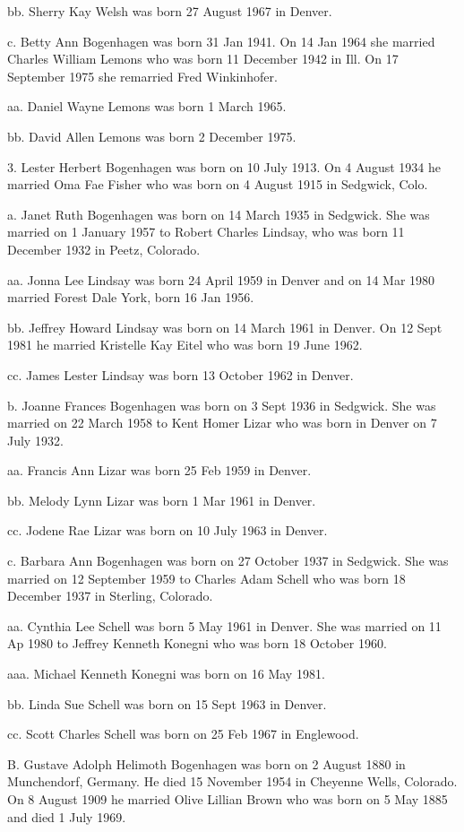 \documentclass[a4paper]{article}
\begin{document}
bb. Sherry Kay Welsh was born 27 August 1967 in Denver.

c. Betty Ann Bogenhagen was born 31 Jan 1941.  On 14 Jan 1964 she married Charles William Lemons who was born 11 December 1942 in Ill. On 17 September  1975 she remarried Fred Winkinhofer.

aa. Daniel Wayne Lemons was born 1 March 1965.

bb. David Allen Lemons was born 2 December 1975.

3. Lester Herbert Bogenhagen was born on 10 July 1913.  On 4 August 1934 he married Oma Fae Fisher who was born on 4 August 1915 in Sedgwick, Colo.

a. Janet Ruth Bogenhagen was born on 14 March 1935 in Sedgwick. She was married on 1 January 1957 to Robert Charles Lindsay, who was born 11 December 1932 in Peetz, Colorado.
 
aa. Jonna Lee Lindsay was born 24 April 1959 in Denver and on 14 Mar 1980 married Forest Dale York, born 16 Jan 1956.
			
bb.  Jeffrey Howard Lindsay was born on 14 March 1961 in Denver.  On 12 Sept 1981 he married Kristelle Kay Eitel who was born 19 June 1962.

cc. James Lester Lindsay was born 13 October 1962 in Denver.

b. Joanne Frances Bogenhagen was born on 3 Sept 1936 in Sedgwick. She was married on 22 March 1958 to Kent Homer Lizar who was born in Denver on 7 July 1932.

aa. Francis Ann Lizar was born 25 Feb 1959 in Denver.

bb. Melody Lynn Lizar was born 1 Mar 1961 in Denver.

cc. Jodene Rae Lizar was born on 10 July 1963 in Denver.
		
c. Barbara Ann Bogenhagen was born on 27 October 1937 in Sedgwick. She was married on 12 September 1959 to Charles Adam Schell who was born 18 December 1937 in Sterling, Colorado.

aa. Cynthia Lee Schell was born 5 May 1961 in Denver.  She was married on 11 Ap 1980 to Jeffrey Kenneth Konegni who was born 18 October 1960.

aaa. Michael Kenneth Konegni was born on 16 May 1981.

bb. Linda Sue Schell was born on 15 Sept 1963 in Denver.

cc. Scott Charles Schell was born on 25 Feb 1967 in Englewood.

B. Gustave Adolph Helimoth Bogenhagen was born on 2 August 1880 in Munchendorf, Germany.  He died 15 November 1954 in Cheyenne Wells, Colorado.  On 8 August 1909 he married Olive Lillian Brown who was born on 5 May 1885 and died 1 July 1969.
\end{document}
